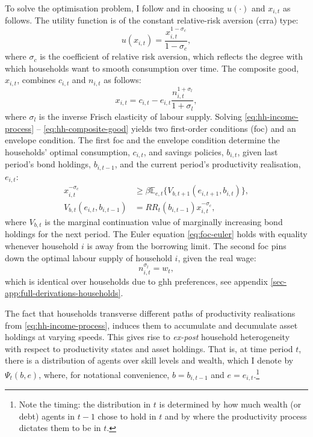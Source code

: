 \documentclass[a4paper,12pt]{article} %
\numberwithin{equation}{section} %
\numberwithin{figure}{section}
\numberwithin{table}{section}
\begin{document}
To solve the optimisation problem, I follow \textcite{boehl2023econpizza} and \textcite{bayer2023} in choosing $u( \cdot )$ and $x_{i,t}$ as follows. The utility function is of the constant relative-risk aversion (\Gls{crra}) type:
\begin{equation}
    u(x_{i,t}) = \frac{x_{i,t}^{1-\sigma_c}}{1-\sigma_c}, \label{eq:hh-utility-fun}
\end{equation}
where $\sigma_c$ is the coefficient of relative risk aversion, which reflects the degree with which households want to smooth consumption over time. The composite good, $x_{i,t}$, combines $c_{i,t}$ and $n_{i,t}$ as follows:
\begin{equation}
    x_{i,t} = c_{i,t} - e_{i,t}\frac{n_{i,t}^{1+\sigma_l}}{1+\sigma_l},
    \label{eq:hh-composite-good}
\end{equation}
where $\sigma_l$ is the inverse Frisch elasticity of labour supply. Solving \eqref{eq:hh-income-process} -- \eqref{eq:hh-composite-good} yields two first-order conditions (\Gls{foc}) and an envelope condition. The first \Gls{foc} and the envelope condition determine the households' optimal consumption, $c_{i,t}$, and savings policies, $b_{i,t}$, given last period's bond holdings, $b_{i,t-1}$, and the current period's productivity realisation, $e_{i,t}$:
\begin{align}
    x_{i,t}^{-\sigma_c} &\ge \beta \mathbb{E}_{e,t} \{ V_{b,t+1} (e_{i,t+1}, b_{i,t}) \}, \label{eq:foc-euler} \\
    V_{b,t} (e_{i,t}, b_{i,t-1}) &= RR_t (b_{i,t-1}) x_{i,t}^{-\sigma_c}, \label{eq:foc-envelope} 
\end{align}
where $V_{b,t}$ is the marginal continuation value of marginally increasing bond holdings for the next period. The Euler equation \eqref{eq:foc-euler} holds with equality whenever household $i$ is away from the borrowing limit. The second \Gls{foc} pins down the optimal labour supply of household $i$, given the real wage:
\begin{equation}
n_{i,t}^{\sigma_l} = w_t, \label{eq:foc-labour-supply}
\end{equation}
which is identical over households due to \Gls{ghh} preferences, see appendix \ref{sec-app:full-derivations-households}.

The fact that households transverse different paths of productivity realisations from \eqref{eq:hh-income-process}, induces them to accumulate and decumulate asset holdings at varying speeds. This gives rise to \textit{ex-post} household heterogeneity with respect to productivity states and asset holdings. That is, at time period $t$, there is a distribution of agents over skill levels and wealth, which I denote by $\Psi_t (b,e)$, where, for notational convenience, $b=b_{i,t-1}$ and $e=e_{i,t}$.\footnote{Note the timing: the distribution in $t$ is determined by how much wealth (or debt) agents in $t-1$ chose to hold in $t$ and by where the productivity process dictates them to be in $t$.}
\end{document}
